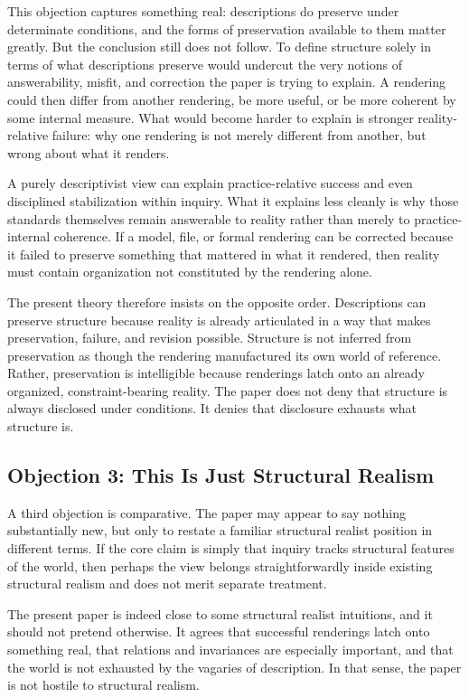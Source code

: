 \documentclass[11pt]{article}
\begin{document}
This objection captures something real: descriptions do preserve under determinate conditions, and the forms of preservation available to them matter greatly. But the conclusion still does not follow. To define structure solely in terms of what descriptions preserve would undercut the very notions of answerability, misfit, and correction the paper is trying to explain. A rendering could then differ from another rendering, be more useful, or be more coherent by some internal measure. What would become harder to explain is stronger reality-relative failure: why one rendering is not merely different from another, but wrong about what it renders.

A purely descriptivist view can explain practice-relative success and even disciplined stabilization within inquiry. What it explains less cleanly is why those standards themselves remain answerable to reality rather than merely to practice-internal coherence. If a model, file, or formal rendering can be corrected because it failed to preserve something that mattered in what it rendered, then reality must contain organization not constituted by the rendering alone.

The present theory therefore insists on the opposite order. Descriptions can preserve structure because reality is already articulated in a way that makes preservation, failure, and revision possible. Structure is not inferred from preservation as though the rendering manufactured its own world of reference. Rather, preservation is intelligible because renderings latch onto an already organized, constraint-bearing reality. The paper does not deny that structure is always disclosed under conditions. It denies that disclosure exhausts what structure is.

\subsection{Objection 3: This Is Just Structural Realism}

A third objection is comparative. The paper may appear to say nothing substantially new, but only to restate a familiar structural realist position in different terms. If the core claim is simply that inquiry tracks structural features of the world, then perhaps the view belongs straightforwardly inside existing structural realism and does not merit separate treatment.

The present paper is indeed close to some structural realist intuitions, and it should not pretend otherwise. It agrees that successful renderings latch onto something real, that relations and invariances are especially important, and that the world is not exhausted by the vagaries of description. In that sense, the paper is not hostile to structural realism.
\end{document}
